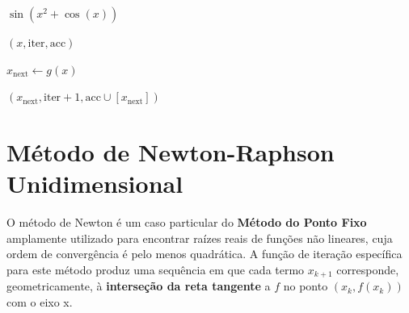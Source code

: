 \begin{algorithm}[H]
    \caption{Método do Ponto Fixo Recursivo}
    \label{alg:pontofixo_funcional}
    \begin{algorithmic}[1]
            \State \Return $\sin(x^2 + \cos(x))$
        \EndFunction

            
             
                    \State \Return $(x, \text{iter}, \text{acc})$ 
                \EndIf

                \State $x_{\text{next}} \gets g(x)$
                
                    \State \Return $(x_{\text{next}}, \text{iter} + 1, \text{acc} \cup [x_{\text{next}}])$ 
                \Else
                    \State \Return {} 
                \EndIf
            \EndFunction

            \State \Return {} 
        \EndProcedure
    \end{algorithmic}
\end{algorithm}

\section{Método de Newton-Raphson Unidimensional}\label{sec:NR1d}




O método de Newton é um caso particular do \textbf{Método do Ponto Fixo} amplamente utilizado para encontrar raízes %
reais de funções não lineares, cuja ordem de convergência é pelo menos quadrática. A função de iteração específica para este método produz uma sequência em que cada termo $x_{k+1}$ corresponde, geometricamente, à \textbf{interseção da reta tangente} a $f$ no ponto $(x_k, f(x_k))$ com o eixo x. 

